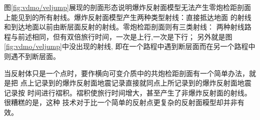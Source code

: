 图\ref{fig:vdmo/veljump}展现的剖面形态说明爆炸反射面模型无法产生零炮检距剖面
上能见到的所有射线。爆炸反射面模型产生两种类型射线：直接抵达地面
的射线和到达地面以前由断层面反射的射线。零炮检距剖面则有三类射线：
两种射线路程与前述相同，但有双倍旅行时间，一次是上行,一次是下行；
另外就是图\ref{fig:vdmo/veljump}中没出现的射线,
即在一个路程中遇到断层面而在另一个路程中则遇不到断层面。

当反射体只是一个点时，要作横向可变介质中的共炮检距剖面有一个简单办法，就是把
点上记录到的爆炸反射面地震记录直接就同点上所记录到的爆炸反射面地震记录按
时间进行褶积。褶积使旅行时间增大，甚至产生了非爆炸反射面的射线。很糟糕的是，这种
技术对于比一个简单的反射点更复杂的反射面糢型却并非有效。






